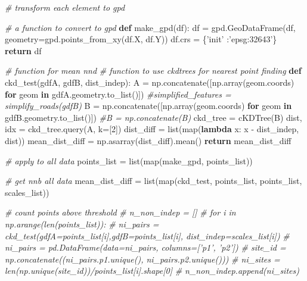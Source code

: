 \documentclass[]{article}
\newenvironment{Shaded}{}{}
\newcommand{\BuiltInTok}[1]{#1}
\newcommand{\CommentTok}[1]{\textcolor[rgb]{0.38,0.63,0.69}{\textit{#1}}}
\newcommand{\ControlFlowTok}[1]{\textcolor[rgb]{0.00,0.44,0.13}{\textbf{#1}}}
\newcommand{\DecValTok}[1]{\textcolor[rgb]{0.25,0.63,0.44}{#1}}
\newcommand{\KeywordTok}[1]{\textcolor[rgb]{0.00,0.44,0.13}{\textbf{#1}}}
\newcommand{\NormalTok}[1]{#1}
\newcommand{\OperatorTok}[1]{\textcolor[rgb]{0.40,0.40,0.40}{#1}}
\newcommand{\StringTok}[1]{\textcolor[rgb]{0.25,0.44,0.63}{#1}}
\begin{document}
\begin{Shaded}
\begin{Highlighting}[]
\CommentTok{# transform each element to gpd}


\CommentTok{# a function to convert to gpd}
\KeywordTok{def}\NormalTok{ make_gpd(df):}
\NormalTok{    df }\OperatorTok{=}\NormalTok{ gpd.GeoDataFrame(df, geometry}\OperatorTok{=}\NormalTok{gpd.points_from_xy(df.X, df.Y))}
\NormalTok{    df.crs }\OperatorTok{=}\NormalTok{ \{}\StringTok{'init'}\NormalTok{ :}\StringTok{'epsg:32643'}\NormalTok{\}}
    \ControlFlowTok{return}\NormalTok{ df}


\CommentTok{# function for mean nnd}
\CommentTok{# function to use ckdtrees for nearest point finding}
\KeywordTok{def}\NormalTok{ ckd_test(gdfA, gdfB, dist_indep):}
\NormalTok{    A }\OperatorTok{=}\NormalTok{ np.concatenate([np.array(geom.coords) }\ControlFlowTok{for}\NormalTok{ geom }\KeywordTok{in}\NormalTok{ gdfA.geometry.to_list()])}
    \CommentTok{#simplified_features = simplify_roads(gdfB)}
\NormalTok{    B }\OperatorTok{=}\NormalTok{ np.concatenate([np.array(geom.coords) }\ControlFlowTok{for}\NormalTok{ geom }\KeywordTok{in}\NormalTok{ gdfB.geometry.to_list()])}
    \CommentTok{#B = np.concatenate(B)}
\NormalTok{    ckd_tree }\OperatorTok{=}\NormalTok{ cKDTree(B)}
\NormalTok{    dist, idx }\OperatorTok{=}\NormalTok{ ckd_tree.query(A, k}\OperatorTok{=}\NormalTok{[}\DecValTok{2}\NormalTok{])}
\NormalTok{    dist_diff }\OperatorTok{=} \BuiltInTok{list}\NormalTok{(}\BuiltInTok{map}\NormalTok{(}\KeywordTok{lambda}\NormalTok{ x: x }\OperatorTok{-}\NormalTok{ dist_indep, dist))}
\NormalTok{    mean_dist_diff }\OperatorTok{=}\NormalTok{ np.asarray(dist_diff).mean()}
    \ControlFlowTok{return}\NormalTok{ mean_dist_diff}


\CommentTok{# apply to all data}
\NormalTok{points_list }\OperatorTok{=} \BuiltInTok{list}\NormalTok{(}\BuiltInTok{map}\NormalTok{(make_gpd, points_list))}

\CommentTok{# get nnb all data}
\NormalTok{mean_dist_diff }\OperatorTok{=} \BuiltInTok{list}\NormalTok{(}\BuiltInTok{map}\NormalTok{(ckd_test, points_list, points_list, scales_list))}

\CommentTok{# count points above threshold}
\CommentTok{# n_non_indep = []}
\CommentTok{# for i in np.arange(len(points_list)):}
\CommentTok{#     ni_pairs = ckd_test(gdfA=points_list[i],gdfB=points_list[i], dist_indep=scales_list[i])}
\CommentTok{#     ni_pairs = pd.DataFrame(data=ni_pairs, columns=['p1', 'p2'])}
\CommentTok{#     site_id = np.concatenate((ni_pairs.p1.unique(), ni_pairs.p2.unique()))}
\CommentTok{#     ni_sites = len(np.unique(site_id))/points_list[i].shape[0]}
\CommentTok{#     n_non_indep.append(ni_sites)}
\end{Highlighting}
\end{Shaded}
\end{document}
